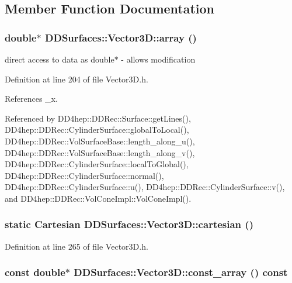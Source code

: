 \subsection{Member Function Documentation}
\hypertarget{class_d_d_surfaces_1_1_vector3_d_a467bf79fd3e74223a070ecc612d54526}{
\subsubsection[{array}]{\setlength{\rightskip}{0pt plus 5cm}double$\ast$ DDSurfaces::Vector3D::array ()}}
\label{class_d_d_surfaces_1_1_vector3_d_a467bf79fd3e74223a070ecc612d54526}


direct access to data as double$\ast$ -\/ allows modification 

Definition at line 204 of file Vector3D.h.

References \_\-x.

Referenced by DD4hep::DDRec::Surface::getLines(), DD4hep::DDRec::CylinderSurface::globalToLocal(), DD4hep::DDRec::VolSurfaceBase::length\_\-along\_\-u(), DD4hep::DDRec::VolSurfaceBase::length\_\-along\_\-v(), DD4hep::DDRec::CylinderSurface::localToGlobal(), DD4hep::DDRec::CylinderSurface::normal(), DD4hep::DDRec::CylinderSurface::u(), DD4hep::DDRec::CylinderSurface::v(), and DD4hep::DDRec::VolConeImpl::VolConeImpl().\hypertarget{class_d_d_surfaces_1_1_vector3_d_a983814268a129992e3010f4964cd2b63}{
\subsubsection[{cartesian}]{\setlength{\rightskip}{0pt plus 5cm}static {\bf Cartesian} DDSurfaces::Vector3D::cartesian ()}}
\label{class_d_d_surfaces_1_1_vector3_d_a983814268a129992e3010f4964cd2b63}


Definition at line 265 of file Vector3D.h.\hypertarget{class_d_d_surfaces_1_1_vector3_d_a16dc8cedd8420c5f52dbbdc7674593dd}{
\subsubsection[{const\_\-array}]{\setlength{\rightskip}{0pt plus 5cm}const double$\ast$ DDSurfaces::Vector3D::const\_\-array () const}}
\label{class_d_d_surfaces_1_1_vector3_d_a16dc8cedd8420c5f52dbbdc7674593dd}


